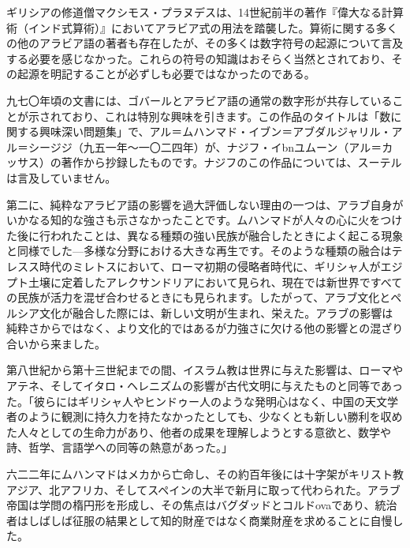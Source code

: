 \documentclass[a4paper,11pt,openany]{ltjsbook}
\begin{document}
ギリシアの修道僧マクシモス・プラヌデスは、14世紀前半の著作『偉大なる計算術（インド式算術）』においてアラビア式の用法を踏襲した。算術に関する多くの他のアラビア語の著者も存在したが、その多くは数字符号の起源について言及する必要を感じなかった。これらの符号の知識はおそらく当然とされており、その起源を明記することが必ずしも必要ではなかったのである。

九七〇年頃の文書には、ゴバールとアラビア語の通常の数字形が共存していることが示されており、これは特別な興味を引きます。この作品のタイトルは「数に関する興味深い問題集」で、アル＝ムハンマド・イブン＝アブダルジャリル・アル＝シージジ（九五一年～一〇二四年）が、ナジフ・イbnユムーン（アル＝カッサス）の著作から抄録したものです。ナジフのこの作品については、スーテルは言及していません。

第二に、純粋なアラビア語の影響を過大評価しない理由の一つは、アラブ自身がいかなる知的な強さも示さなかったことです。ムハンマドが人々の心に火をつけた後に行われたことは、異なる種類の強い民族が融合したときによく起こる現象と同様でした—多様な分野における大きな再生です。そのような種類の融合はテレスス時代のミレトスにおいて、ローマ初期の侵略者時代に、ギリシャ人がエジプト土壌に定着したアレクサンドリアにおいて見られ、現在では新世界ですべての民族が活力を混ぜ合わせるときにも見られます。したがって、アラブ文化とペルシア文化が融合した際には、新しい文明が生まれ、栄えた。アラブの影響は純粋さからではなく、より文化的ではあるが力強さに欠ける他の影響との混ざり合いから来ました。

第八世紀から第十三世紀までの間、イスラム教は世界に与えた影響は、ローマやアテネ、そしてイタロ・ヘレニズムの影響が古代文明に与えたものと同等であった。「彼らにはギリシャ人やヒンドゥー人のような発明心はなく、中国の天文学者のように観測に持久力を持たなかったとしても、少なくとも新しい勝利を収めた人々としての生命力があり、他者の成果を理解しようとする意欲と、数学や詩、哲学、言語学への同等の熱意があった。」

六二二年にムハンマドはメカから亡命し、その約百年後には十字架がキリスト教アジア、北アフリカ、そしてスペインの大半で新月に取って代わられた。アラブ帝国は学問の楕円形を形成し、その焦点はバグダッドとコルドovaであり、統治者はしばしば征服の結果として知的財産ではなく商業財産を求めることに自慢した。
\end{document}
